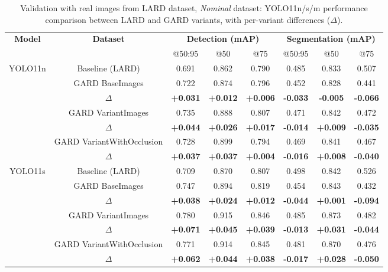 \begin{table}[htbp]
\centering
\small
\setlength{\tabcolsep}{4pt}
\renewcommand{\arraystretch}{1.2}

  \caption{Validation with real images from LARD dataset, \emph{Nominal} dataset: YOLO11n/s/m performance comparison between LARD and GARD variants, with per-variant differences ($\Delta$).}
  \label{tab:nominal_results}

\begin{tabular}{|c|c|ccc|ccc|}
\hline
\multirow{2}{*}{\textbf{Model}} &
\multirow{2}{*}{\textbf{Dataset}} &
\multicolumn{3}{c|}{\textbf{Detection (mAP)}} &
\multicolumn{3}{c|}{\textbf{Segmentation (mAP)}} \\
& & @50:95 & @50 & @75 & @50:95 & @50 & @75 \\

\hline
\multirow{6}{*}{YOLO11n}
& Baseline (LARD) & 0.691 & 0.862 & 0.790 & 0.485 & 0.833 & 0.507 \\
& GARD BaseImages & 0.722 & 0.874 & 0.796 & 0.452 & 0.828 & 0.441 \\
& $\Delta$ & \textbf{+0.031} & \textbf{+0.012} & \textbf{+0.006} & \textbf{-0.033} & \textbf{-0.005} & \textbf{-0.066} \\
& GARD VariantImages & 0.735 & 0.888 & 0.807 & 0.471 & 0.842 & 0.472 \\
& $\Delta$ & \textbf{+0.044} & \textbf{+0.026} & \textbf{+0.017} & \textbf{-0.014} & \textbf{+0.009} & \textbf{-0.035} \\
& GARD VariantWithOcclusion & 0.728 & 0.899 & 0.794 & 0.469 & 0.841 & 0.467 \\
& $\Delta$ & \textbf{+0.037} & \textbf{+0.037} & \textbf{+0.004} & \textbf{-0.016} & \textbf{+0.008} & \textbf{-0.040} \\
\hline

\hline
\multirow{6}{*}{YOLO11s}
& Baseline (LARD) & 0.709 & 0.870 & 0.807 & 0.498 & 0.842 & 0.526 \\
& GARD BaseImages & 0.747 & 0.894 & 0.819 & 0.454 & 0.843 & 0.432 \\
& $\Delta$ & \textbf{+0.038} & \textbf{+0.024} & \textbf{+0.012} & \textbf{-0.044} & \textbf{+0.001} & \textbf{-0.094} \\
& GARD VariantImages & 0.780 & 0.915 & 0.846 & 0.485 & 0.873 & 0.482 \\
& $\Delta$ & \textbf{+0.071} & \textbf{+0.045} & \textbf{+0.039} & \textbf{-0.013} & \textbf{+0.031} & \textbf{-0.044} \\
& GARD VariantWithOcclusion & 0.771 & 0.914 & 0.845 & 0.481 & 0.870 & 0.476 \\
& $\Delta$ & \textbf{+0.062} & \textbf{+0.044} & \textbf{+0.038} & \textbf{-0.017} & \textbf{+0.028} & \textbf{-0.050} \\
\hline



\end{tabular}
\end{table}
